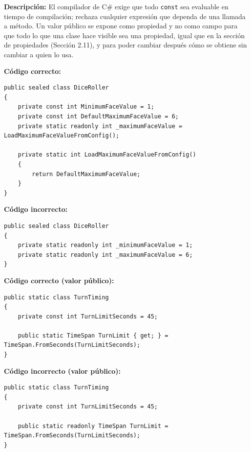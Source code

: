 \textbf{Descripción:} El compilador de C\# exige que todo \texttt{const} sea evaluable en tiempo de compilación; rechaza cualquier expresión que dependa de una llamada a método. Un valor público se expone como propiedad y no como campo para que todo lo que una clase hace visible sea una propiedad, igual que en la sección de propiedades (Sección 2.11), y para poder cambiar después cómo se obtiene sin cambiar a quien lo usa.

\textbf{Código correcto:}
\begin{lstlisting}[style=csharpstyle]
public sealed class DiceRoller
{
    private const int MinimumFaceValue = 1;
    private const int DefaultMaximumFaceValue = 6;
    private static readonly int _maximumFaceValue = LoadMaximumFaceValueFromConfig();

    private static int LoadMaximumFaceValueFromConfig()
    {
        return DefaultMaximumFaceValue;
    }
}
\end{lstlisting}

\textbf{Código incorrecto:}
\begin{lstlisting}[style=csharpstyle]
public sealed class DiceRoller
{
    private static readonly int _minimumFaceValue = 1;
    private static readonly int _maximumFaceValue = 6;
}
\end{lstlisting}

\textbf{Código correcto (valor público):}
\begin{lstlisting}[style=csharpstyle]
public static class TurnTiming
{
    private const int TurnLimitSeconds = 45;

    public static TimeSpan TurnLimit { get; } = TimeSpan.FromSeconds(TurnLimitSeconds);
}
\end{lstlisting}

\textbf{Código incorrecto (valor público):}
\begin{lstlisting}[style=csharpstyle]
public static class TurnTiming
{
    private const int TurnLimitSeconds = 45;

    public static readonly TimeSpan TurnLimit = TimeSpan.FromSeconds(TurnLimitSeconds);
}
\end{lstlisting}
